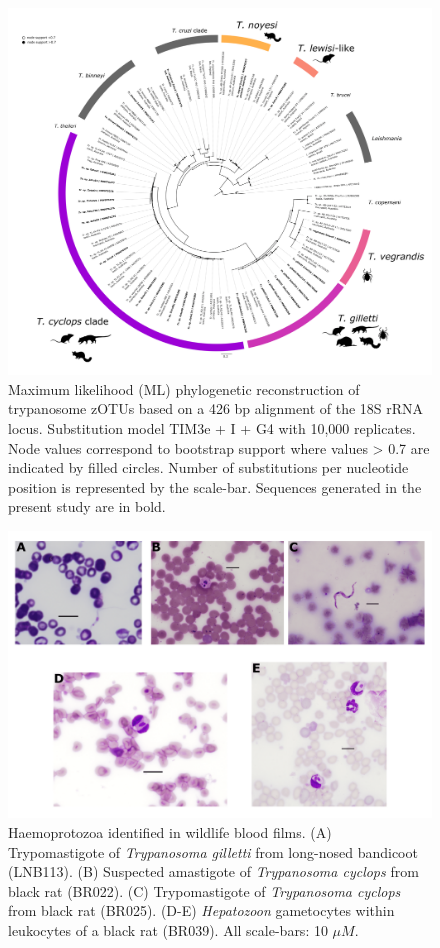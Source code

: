 \documentclass[a4paper, nobind]{templates/ociamthesis}
\begin{document}
\begin{figure}
\includegraphics[width=0.95\linewidth]{figures/ms-figs/Ch4-trypNGStree} \caption[Phylogeny of trypanosomes species from wildlife.]{Maximum likelihood (ML) phylogenetic reconstruction of trypanosome zOTUs based on a 426 bp alignment of the 18S rRNA locus. Substitution model TIM3e + I + G4 with 10,000 replicates. Node values correspond to bootstrap support where values > 0.7 are indicated by filled circles. Number of substitutions per nucleotide position is represented by the scale-bar. Sequences generated in the present study are in bold.}\label{fig:Ch4tryptree}
\end{figure}

\begin{figure}
\includegraphics[width=0.95\linewidth]{figures/ms-figs/Ch4-microscopy-images} \caption[Haemoprotozoans identified in wildlife blood films.]{Haemoprotozoa identified in wildlife blood films. (A) Trypomastigote of \textit{Trypanosoma gilletti} from long-nosed bandicoot (LNB113). (B) Suspected amastigote of \textit{Trypanosoma cyclops} from black rat (BR022). (C) Trypomastigote of \textit{Trypanosoma cyclops} from black rat (BR025). (D-E) \textit{Hepatozoon} gametocytes within leukocytes of a black rat (BR039). All scale-bars: 10 $\mu M$.}\label{fig:microscopy}
\end{figure}
\end{document}
